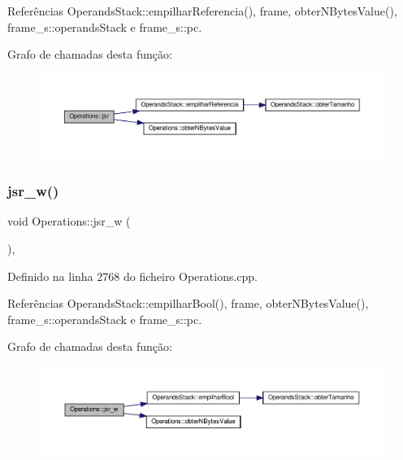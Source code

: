 Referências Operands\+Stack\+::empilhar\+Referencia(), frame, obter\+N\+Bytes\+Value(), frame\+\_\+s\+::operands\+Stack e frame\+\_\+s\+::pc.

Grafo de chamadas desta função\+:\nopagebreak
\begin{figure}[H]
\begin{center}
\leavevmode
\includegraphics[width=350pt]{classOperations_a63c3ab8fef60a8a19ee336cb3d86f9aa_cgraph}
\end{center}
\end{figure}
\mbox{\label{classOperations_a22241dabd3678c4ab77bbe5882c3a4db}} 
\subsubsection{\texorpdfstring{jsr\+\_\+w()}{jsr\_w()}}
{\footnotesize\ttfamily void Operations\+::jsr\+\_\+w (\begin{DoxyParamCaption}{ }\end{DoxyParamCaption})\hspace{0.3cm}{\ttfamily [static]}, {\ttfamily [private]}}



Definido na linha 2768 do ficheiro Operations.\+cpp.



Referências Operands\+Stack\+::empilhar\+Bool(), frame, obter\+N\+Bytes\+Value(), frame\+\_\+s\+::operands\+Stack e frame\+\_\+s\+::pc.

Grafo de chamadas desta função\+:\nopagebreak
\begin{figure}[H]
\begin{center}
\leavevmode
\includegraphics[width=350pt]{classOperations_a22241dabd3678c4ab77bbe5882c3a4db_cgraph}
\end{center}
\end{figure}
\mbox{\label{classOperations_aab1532a2f22ab943a1ec37e33ae742b3}} 
